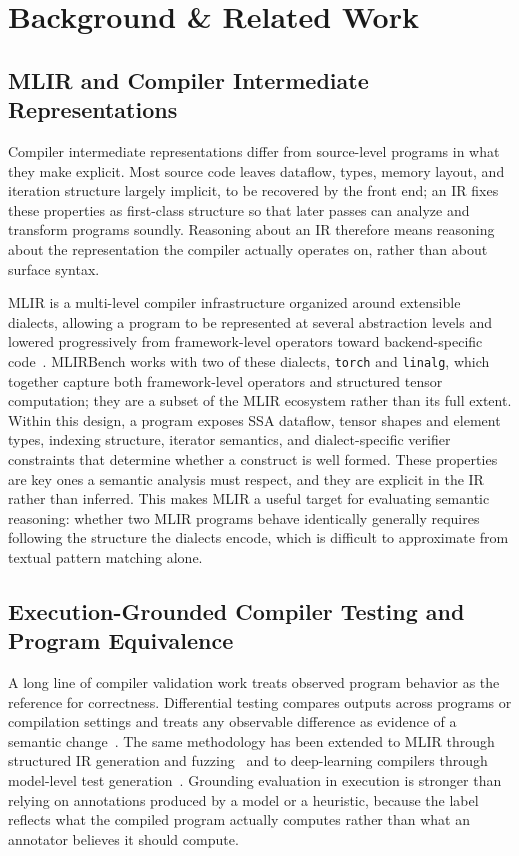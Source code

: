 \documentclass[sigplan,screen,review,anonymous]{acmart}
\begin{document}
\section{Background \& Related Work}

\subsection{MLIR and Compiler Intermediate Representations}

Compiler intermediate representations differ from source-level programs in what they make explicit. Most source code leaves dataflow, types, memory layout, and iteration structure largely implicit, to be recovered by the front end; an IR fixes these properties as first-class structure so that later passes can analyze and transform programs soundly. Reasoning about an IR therefore means reasoning about the representation the compiler actually operates on, rather than about surface syntax.

MLIR is a multi-level compiler infrastructure organized around extensible dialects, allowing a program to be represented at several abstraction levels and lowered progressively from framework-level operators toward backend-specific code~\cite{mlir2021}. MLIRBench works with two of these dialects, \texttt{torch} and \texttt{linalg}, which together capture both framework-level operators and structured tensor computation; they are a subset of the MLIR ecosystem rather than its full extent. Within this design, a program exposes SSA dataflow, tensor shapes and element types, indexing structure, iterator semantics, and dialect-specific verifier constraints that determine whether a construct is well formed. These properties are key ones a semantic analysis must respect, and they are explicit in the IR rather than inferred. This makes MLIR a useful target for evaluating semantic reasoning: whether two MLIR programs behave identically generally requires following the structure the dialects encode, which is difficult to approximate from textual pattern matching alone.

\subsection{Execution-Grounded Compiler Testing and Program Equivalence}

A long line of compiler validation work treats observed program behavior as the reference for correctness. Differential testing compares outputs across programs or compilation settings and treats any observable difference as evidence of a semantic change~\cite{yang2011csmith,le2014emi}. The same methodology has been extended to MLIR through structured IR generation and fuzzing~\cite{wang2023mlirsmith,suo2024mlirod} and to deep-learning compilers through model-level test generation~\cite{liu2023nnsmith}. Grounding evaluation in execution is stronger than relying on annotations produced by a model or a heuristic, because the label reflects what the compiled program actually computes rather than what an annotator believes it should compute.
\end{document}
